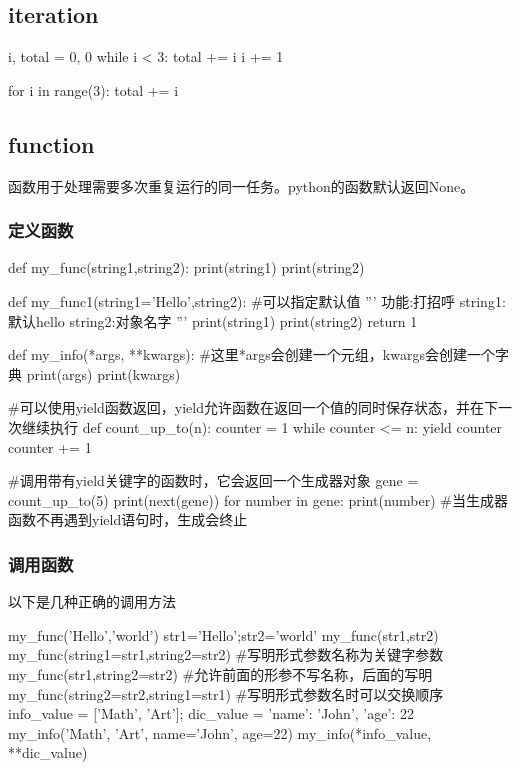 \documentclass{article}
\begin{document}
    \subsection{iteration}
      \begin{codeblock}[language=python, caption={iteration}]
        i, total = 0, 0
        while i < 3:
          total += i
          i += 1

        for i in range(3):
          total += i
      \end{codeblock}

    \subsection{function}
      函数用于处理需要多次重复运行的同一任务。python的函数默认返回None。
      \subsubsection{定义函数}
        \begin{codeblock}[language=python, caption={definition of functions}]
          def my_func(string1,string2):
            print(string1)
            print(string2)

          def my_func1(string1='Hello',string2): #可以指定默认值
            ''' 功能:打招呼
                string1:默认hello
                string2:对象名字 '''
            print(string1)
            print(string2)
            return 1

          def my_info(*args, **kwargs): #这里*args会创建一个元组，kwargs会创建一个字典
            print(args)
            print(kwargs)

          #可以使用yield函数返回，yield允许函数在返回一个值的同时保存状态，并在下一次继续执行
          def count_up_to(n):
              counter = 1
              while counter <= n:
                  yield counter
                  counter += 1

          #调用带有yield关键字的函数时，它会返回一个生成器对象
          gene = count_up_to(5)
          print(next(gene))
          for number in gene:
              print(number)
          #当生成器函数不再遇到yield语句时，生成会终止
        \end{codeblock}

      \subsubsection{调用函数}
        以下是几种正确的调用方法
        \begin{codeblock}[language=python, caption={use of function}]
          my_func('Hello','world')
          str1='Hello';str2='world'
          my_func(str1,str2)
          my_func(string1=str1,string2=str2) #写明形式参数名称为关键字参数
          my_func(str1,string2=str2) #允许前面的形参不写名称，后面的写明
          my_func(string2=str2,string1=str1) #写明形式参数名时可以交换顺序
          info_value = ['Math', 'Art']; dic_value = {'name': 'John', 'age': 22}
          my_info('Math', 'Art', name='John', age=22)
          my_info(*info_value, **dic_value)
        \end{codeblock}
\end{document}

